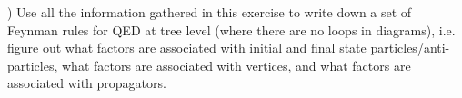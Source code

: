\documentclass[working, oneside]{../../../Preambles/tuftebook}
\begin{document}
\vspace{1em}
) Use all the information gathered in this exercise to write down a set of 
Feynman rules for QED at tree level (where there are no loops in diagrams), 
i.e. figure out what factors are associated with initial and 
final state particles/anti-particles, what factors are associated with vertices, and 
what factors are associated with propagators. 
\end{document}
